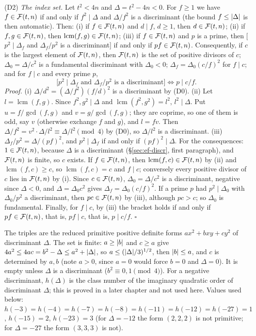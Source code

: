 \label{fact:ef-D2}(D2) \emph{The index set.} Let $t^2<4n$ and $\Delta=t^2-4n<0$. For $f\ge1$ we have $f\in\mathcal{F}(t,n)$ if and only if
$f^2\mid\Delta$ and $\Delta/f^2$ is a discriminant (the bound $f\le\lvert\Delta\rvert$ is then automatic). Then:
(i) if $f\in\mathcal{F}(t,n)$ and $d\mid f$, $d\ge1$, then $d\in\mathcal{F}(t,n)$;
(ii) if $f,g\in\mathcal{F}(t,n)$, then $\operatorname{lcm}(f,g)\in\mathcal{F}(t,n)$;
(iii) if $f\in\mathcal{F}(t,n)$ and $p$ is a prime, then [$p^2\mid\Delta_f$ and $\Delta_f/p^2$ is a discriminant] if and only if $pf\in\mathcal{F}(t,n)$.
Consequently, if $c$ is the largest element of $\mathcal{F}(t,n)$, then $\mathcal{F}(t,n)$ is the set of positive divisors of $c$; $\Delta_0=\Delta/c^2$ is a
fundamental discriminant with $\Delta_0<0$; $\Delta_f=\Delta_0(c/f)^2$ for $f\mid c$; and for $f\mid c$ and every prime $p$,
\[
  \bigl[p^2\mid\Delta_f\text{ and }\Delta_f/p^2\text{ is a discriminant}\bigr]\iff p\mid c/f.
\]
\emph{Proof.} (i) $\Delta/d^2=(\Delta/f^2)(f/d)^2$ is a discriminant by (D0). (ii) Let $l=\operatorname{lcm}(f,g)$. Since $f^2,g^2\mid\Delta$ and
$\operatorname{lcm}(f^2,g^2)=l^2$, $l^2\mid\Delta$. Put $u=f/\gcd(f,g)$ and $v=g/\gcd(f,g)$; they are coprime, so one of them is odd, say $v$ (otherwise
exchange $f$ and $g$), and $l=fv$. Then $\Delta/f^2=v^2\cdot\Delta/l^2\equiv\Delta/l^2\pmod4$ by (D0), so $\Delta/l^2$ is a discriminant.
(iii) $\Delta_f/p^2=\Delta/(pf)^2$, and $p^2\mid\Delta_f$ if and only if $(pf)^2\mid\Delta$. For the consequences: $1\in\mathcal{F}(t,n)$, because
$\Delta$ is a discriminant (\S\ref{sec:ef-discr}, first paragraph), and $\mathcal{F}(t,n)$ is finite, so $c$ exists. If $f\in\mathcal{F}(t,n)$, then
$\operatorname{lcm}(f,c)\in\mathcal{F}(t,n)$ by (ii) and $\operatorname{lcm}(f,c)\ge c$, so $\operatorname{lcm}(f,c)=c$ and $f\mid c$; conversely every
positive divisor of $c$ lies in $\mathcal{F}(t,n)$ by (i). Since $c\in\mathcal{F}(t,n)$, $\Delta_0=\Delta/c^2$ is a discriminant, negative since $\Delta<0$, and
$\Delta=\Delta_0c^2$ gives $\Delta_f=\Delta_0(c/f)^2$. If a prime $p$ had $p^2\mid\Delta_0$ with $\Delta_0/p^2$ a discriminant, then $pc\in\mathcal{F}(t,n)$
by (iii), although $pc>c$; so $\Delta_0$ is fundamental. Finally, for $f\mid c$, by (iii) the bracket holds if and only if $pf\in\mathcal{F}(t,n)$, that is,
$pf\mid c$, that is, $p\mid c/f$. $\square$

\begin{definition}
\end{definition}
\noindent The triples are the reduced primitive positive definite forms $ax^2+bxy+cy^2$ of discriminant $\Delta$. The set is finite: $a\ge\lvert b\rvert$
and $c\ge a$ give $4a^2\le4ac=b^2-\Delta\le a^2+\lvert\Delta\rvert$, so $a\le(\lvert\Delta\rvert/3)^{1/2}$, then $\lvert b\rvert\le a$, and $c$ is determined by $a,b$
(note $a>0$, since $a=0$ would force $b=0$ and $\Delta=0$). It is empty unless $\Delta$ is a discriminant ($b^2\equiv0,1\pmod4$). For a negative
discriminant, $h(\Delta)$ is the class number of the imaginary quadratic order of discriminant $\Delta$; this is proved in a later chapter and not
used here. Values used below: $h(-3)=h(-4)=h(-7)=h(-8)=h(-11)=h(-12)=h(-27)=1$, $h(-15)=2$, $h(-23)=3$ (for $\Delta=-12$ the form $(2,2,2)$ is not
primitive; for $\Delta=-27$ the form $(3,3,3)$ is not).

